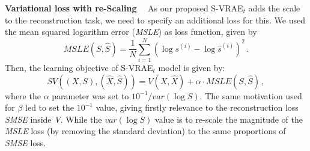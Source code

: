 \textbf{Variational loss with re-Scaling} \ \ As our proposed S-VRAE$_t$ adds the scale to the reconstruction task, we need to specify an additional loss for this. We used the mean squared logarithm error (\textit{MSLE}) as loss function, given by %
\begin{equation}
MSLE(S, \hat{S}) = \frac{1}{N} \sum_{i=1}^N \left( \log{s^{(i)}} - \log{\hat{s}^{(i)}}  \right)^2 \, .
\end{equation}
Then, the learning objective of S-VRAE$_t$ model is given by:
\begin{equation}
    SV \left( (X,S) , (\hat{X},\hat{S}) \right)=  V(X, \hat{X}) + \alpha \cdot MSLE(S, \hat{S}) \, ,
\end{equation}
where the $\alpha$ parameter was set to $10^{-1}/var(\log{S})$. The same motivation used for $\beta$ led to set the $10^{-1}$ value, giving firstly relevance to the reconstruction loss \textit{SMSE} inside \textit{V}. While the $var(\log{S})$ value is to re-scale the magnitude of the \textit{MSLE} loss (by removing the standard deviation) to the same proportions of \textit{SMSE} loss.



